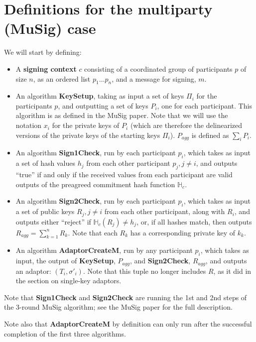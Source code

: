 \documentclass[10pt,a4paper]{article}
\begin{document}
\section{Definitions for the multiparty (MuSig) case}

We will start by defining:

\begin{itemize}
\item A \textbf{signing context} $c$ consisting of a coordinated group of participants $p$ of size $n$, as an ordered list $p_1 \ldots p_n$, and a message for signing, $m$.
\item An algorithm \textbf{KeySetup}, taking as input a set of keys ${\Pi_i}$ for the participants $p$, and outputting a set of keys $P_i$, one for each participant. This algorithm is as defined in the MuSig paper. Note that we will use the notation $x_i$ for the private keys of $P_i$ (which are therefore the delinearized versions of the private keys of the starting keys $\Pi_i$). $P_{agg}$ is defined as $\sum_i P_i$.
\item An algorithm \textbf{Sign1Check}, run by each participant $p_i$, which takes as input a set of hash values $h_j$ from each other participant $p_j, j \neq i$, and outputs ``true'' if and only if the received values from each participant are valid outputs of the preagreed commitment hash function $\mathbb{H}_c$.
\item An algorithm \textbf{Sign2Check}, run by each participant $p_i$, which takes as input a set of public keys $R_j, j \neq i$ from each other participant, along with $R_i$, and outputs either ``reject'' if $\mathbb{H}_c(R_j) \neq h_j$, or, if all hashes match, then outputs $R_{agg} = \sum_{k=1}^{n} R_k$. Note that each $R_k$ has a corresponding private key of $k_k$.
\item An algorithm \textbf{AdaptorCreateM}, run by any participant $p_i$, which takes as input, the output of \textbf{KeySetup}, $P_{agg}$, and \textbf{Sign2Check}, $R_{agg}$, and outputs an adaptor: $(T_i, \sigma'_i)$. Note that this tuple no longer includes $R$, as it did in the section on single-key adaptors.
\end{itemize}

Note that \textbf{Sign1Check} and \textbf{Sign2Check} are running the 1st and 2nd steps of the 3-round MuSig algorithm; see the MuSig paper for the full description.

\vspace{5 pt}

Note also that \textbf{AdaptorCreateM} by definition can only run after the successful completion of the first three algorithms.
\end{document}
